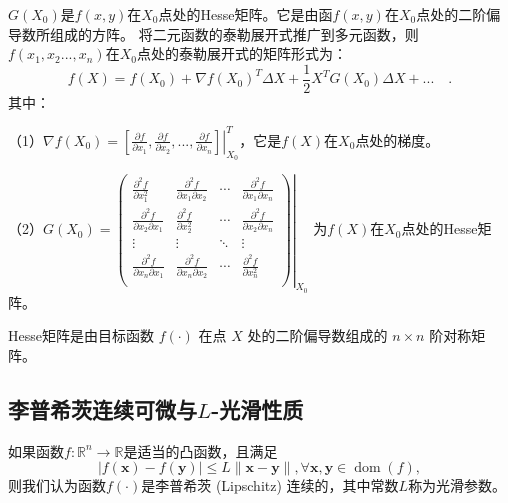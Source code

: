  $G(X_0)$是$f(x,y)$在$X_0$点处的Hesse矩阵。它是由函$f(x,y)$在$X_0$点处的二阶偏导数所组成的方阵。
将二元函数的泰勒展开式推广到多元函数，则$f(x_1,x_2...,x_n)$在$X_0$点处的泰勒展开式的矩阵形式为：
\begin{equation}
    f(X) = f(X_0) + \nabla f(X_0)^T\Delta X + \frac{1}{2}X^TG(X_0)\Delta X + ...\quad.
\end{equation}
其中：

（1）$\nabla f(X_0) = \left.\left[ 
        \displaystyle\frac{\partial f}{\partial x_1},
        \displaystyle\frac{\partial f}{\partial x_2},
        ...,
        \displaystyle\frac{\partial f}{\partial x_n} \right]\right|_{X_0}^T$，它是$f(X)$在$X_0$点处的梯度。
        
（2）$ G(X_0) = 
        \left.
        \begin{pmatrix}
            \displaystyle\frac{\partial^2f}{\partial x_1^2} & \displaystyle\frac{\partial^2f}{\partial x_1\partial x_2} & \cdots & \displaystyle\frac{\partial^2f}{\partial x_1\partial x_n}\\
            \displaystyle\frac{\partial^2f}{\partial x_2\partial x_1} & \displaystyle\frac{\partial^2f}{\partial x_2^2} & \cdots & \displaystyle\frac{\partial^2f}{\partial x_2\partial x_n}\\
            \vdots & \vdots & \ddots & \vdots\\
            \displaystyle\frac{\partial^2f}{\partial x_n\partial x_1} & \displaystyle\frac{\partial^2f}{\partial x_n\partial x_2} & \cdots & \displaystyle\frac{\partial^2f}{\partial x_n^2}\\
        \end{pmatrix}
        \right|_{X_0}$
        为$f(X)$在$X_0$点处的Hesse矩阵。
\begin{definition}[Hesse矩阵]
    Hesse矩阵是由目标函数 $f(\cdot)$ 在点 $X$ 处的二阶偏导数组成的 $n\times n$ 阶对称矩阵。       
\end{definition}

\subsection{李普希茨连续可微与$L$-光滑性质}
\begin{definition}[李普希茨连续]
    如果函数$f: \mathbb{R}^{n} \rightarrow \mathbb{R}$是适当的凸函数，且满足
\begin{equation}
    |f(\bm{x})-f(\bm{y})| \leq L\|\bm{x}-\bm{y}\|, \forall \bm{x}, \bm{y} \in \operatorname{dom}(f),
    \nonumber
\end{equation}
则我们认为函数$f(\cdot)$是李普希茨 (Lipschitz) 连续的，其中常数$L$称为光滑参数。
\end{definition}

